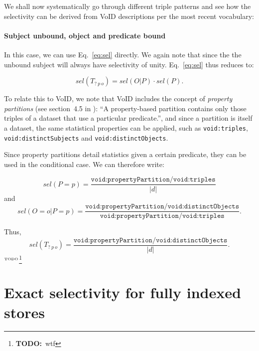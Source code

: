 \documentclass[12pt, draft]{article}
\newcommand{\rdfterm}[1]{\texttt{#1}}
\newcommand{\todo}[1]{\ensuremath{^{\textrm{\tiny{TODO}\normalsize}}}\footnote{\textbf{TODO:}~#1}}
\begin{document}
We shall now systematically go through different triple patterns and
see how the selectivity can be derived from VoID descriptions per the
most recent vocabulary\cite{voidnote}:

\paragraph{Subject unbound, object and predicate bound}

In this case, we can use Eq.~\ref{eq:sel} directly. We again note that
since the the unbound subject will always have selectivity of
unity.
Eq.~\ref{eq:sel} thus reduces to:

\begin{equation}\label{eq:selsubjun}
sel(T_{?~p~o}) = sel(O | P) \cdot sel(P) . 
\end{equation}

To relate this to VoID, we note that VoID includes the concept of
\emph{property partitions} (see section~4.5 in \cite{voidnote}): ``A
property-based partition contains only those triples of a dataset that
use a particular predicate.'', and since a partition is itself a
dataset, the same statistical properties can be applied, such as
\rdfterm{void:triples}, \rdfterm{void:distinctSubjects} and
\rdfterm{void:distinctObjects}. 

Since property partitions detail statistics given a certain predicate,
they can be used in the conditional case. We can therefore write:

\begin{equation}\label{eq:selsubjunp}
sel(P = p) = \frac{\rdfterm{void:propertyPartition/void:triples}}{|d|}
\end{equation}
and
\begin{equation}\label{eq:selsubjunop}
sel(O = o|P = p) =
\frac{\rdfterm{void:propertyPartition/void:distinctObjects}}{\rdfterm{void:propertyPartition/void:triples}} .
\end{equation}

Thus,
\begin{equation}\label{eq:selsubjunres}
sel(T_{?~p~o}) =
\frac{\rdfterm{void:propertyPartition/void:distinctObjects}}{|d|} .
\end{equation}\todo{wtf}



\section{Exact selectivity for fully indexed stores}
\end{document}
